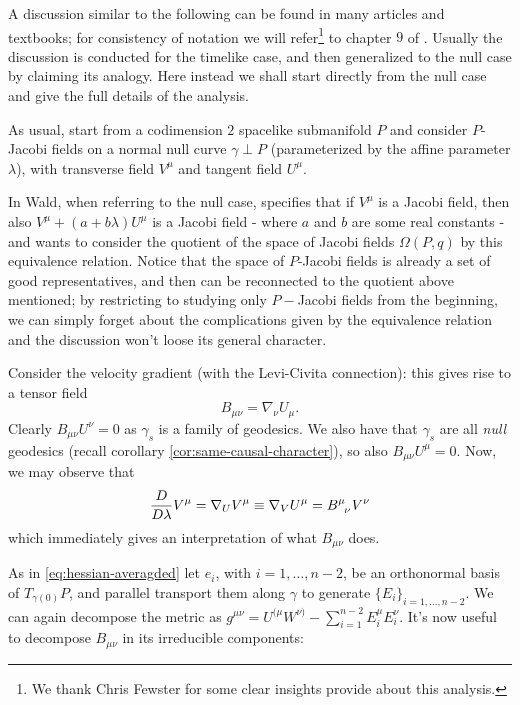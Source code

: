 	A discussion similar to the following can be found in many articles and textbooks; for consistency of notation we will refer\footnote{We thank Chris Fewster for some clear insights provide about this analysis.} to chapter \(9\) of \cite{wald2010general}.
	Usually the discussion is conducted for the timelike case, and then generalized to the null case by claiming its analogy. Here instead we shall start directly from the null case and give the full details of the analysis.
	
	As usual, start from a codimension \(2\) spacelike submanifold \(P\) and consider \(P\)-Jacobi fields on a normal null curve \(\gamma \perp P\) (parameterized by the affine parameter \(\lambda\)), with transverse field \(V^{\mu}\) and tangent field \(U^{\mu}\).
	\begin{remark}
		In \cite{wald2010general} Wald, when referring to the null case, specifies that if \(V^{\mu}\) is a Jacobi field, then also \(V^{\mu} + (a + b\lambda) U^{\mu}\) is a Jacobi field - where \(a\) and \(b\) are some real constants - and wants to consider the quotient of the space of Jacobi fields \(\Omega (P,q)\) by this equivalence relation. Notice that the space of \(P\)-Jacobi fields is already a set of good representatives, and then can be reconnected to the quotient above mentioned; by restricting to studying only \(P-\)Jacobi fields from the beginning, we can simply forget about the complications given by the equivalence relation and the discussion won't loose its general character.
	\end{remark}

	Consider the velocity gradient (with the Levi-Civita connection): this gives rise to a tensor field
	\[
	B_{\mu\nu} = \nabla_{\nu}U_{\mu}.
	\]
	Clearly \(B_{\mu\nu}U^{\nu} = 0\) as \(\gamma_s\) is a family of geodesics. We also have that \(\gamma_s\) are all \emph{null} geodesics (recall corollary \ref{cor:same-causal-character}), so also \(B_{\mu\nu}U^{\mu} = 0\). Now, we may observe that
	\[
	\frac{D}{D\lambda} V^{\mu} = \nabla_U V^{\mu} \equiv \nabla_V U^{\mu} = B\indices{^{\mu}_{\nu}} V^{\nu}
	\]
	which immediately gives an interpretation of what \(B_{\mu\nu}\) does.
	
	As in \ref{eq:hessian-averagded} let \(e_i\), with \(i = 1, \ldots, n - 2\), be an orthonormal basis of \(T_{\gamma(0)}P\), and parallel transport them along \(\gamma\) to generate \(\{E_i\}_{i = 1, \ldots, n-2}\). We can again decompose the metric as \(g^{\mu\nu} = U^{(\mu}W^{\nu)} - \sum_{i=1}^{n - 2}E_i^{\mu}E_i^{\nu}\). It's now useful to decompose \(B_{\mu\nu}\) in its irreducible components:
	
